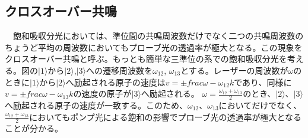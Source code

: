 \documentclass[uplatex, dvipdfmx, a4paper, report, papersize, 11pt]{jsbook}
\begin{document}
\subsection{クロスオーバー共鳴}
　飽和吸収分光においては、準位間の共鳴周波数だけでなく二つの共鳴周波数のちょうど平均の周波数においてもプローブ光の透過率が極大となる。この現象をクロスオーバー共鳴と呼ぶ。もっとも簡単な三準位の系での飽和吸収分光を考える。図の$|1\rangle$から$|2\rangle$,$|3\rangle$への遷移周波数を$\omega_12$, $\omega_13$とする。レーザーの周波数が$\omega$のときに$|1\rangle$から$|2\rangle$へ励起される原子の速度は$v = \pm frac{\omega - \omega_12}{k}$であり、同様に$v = \pm frac{\omega - \omega_13}{k}$の速度の原子が$|3\rangle$へ励起される。
$\omega = \frac{\omega_12 + \omega_13}{2}$のとき、$|2\rangle$、$|3\rangle$へ励起される原子の速度が一致する。このため、$\omega_12$、$\omega_13$においてだけでなく、$\frac{\omega_12 + \omega_13}{2}$においてもポンプ光による飽和の影響でプローブ光の透過率が極大となることが分かる。
\end{document}
